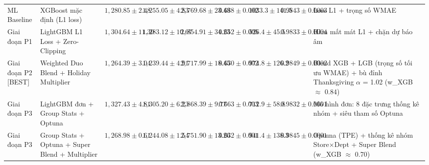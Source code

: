 \begin{table}[htbp]
{\begin{tabular}{llrrrrrrl}
ML Baseline & XGBoost mặc định (L1 loss) & $1{,}280.85 \pm 2.48$ & $1{,}255.05 \pm 4.83$ & $2{,}769.68 \pm 23.48$ & $0.638 \pm 0.002$ & $1033.3 \pm 141.5$ & $0.9843 \pm 0.0003$ & Loss L1 + trọng số WMAE \\
Giai đoạn P1 & LightGBM L1 Loss + Zero-Clipping & $1{,}304.64 \pm 11.30$ & $1{,}283.12 \pm 10.67$ & $2{,}854.91 \pm 34.23$ & $0.652 \pm 0.005$ & $526.4 \pm 45.5$ & $0.9833 \pm 0.0004$ & Hàm mất mát L1 + chặn dự báo âm \\
Giai đoạn P2 [BEST] & Weighted Duo Blend + Holiday Multiplier & \textbf{$1{,}264.39 \pm 3.04$} & \textbf{$1{,}239.44 \pm 4.91$} & \textbf{$2{,}717.99 \pm 18.45$} & \textbf{$0.630 \pm 0.002$} & $974.8 \pm 126.2$ & $0.9849 \pm 0.0002$ & Blend XGB + LGB (trọng số tối ưu WMAE) + bù đỉnh Thanksgiving $\alpha$ = 1.02 (w\_XGB $\approx$ 0.84) \\
Giai đoạn P3 & LightGBM đơn + Group Stats + Optuna & $1{,}327.43 \pm 4.81$ & $1{,}305.20 \pm 6.23$ & $2{,}868.39 \pm 9.77$ & $0.663 \pm 0.003$ & $712.9 \pm 58.8$ & $0.9832 \pm 0.0001$ & Mô hình đơn: 8 đặc trưng thống kê nhóm + siêu tham số Optuna \\
Giai đoạn P3 & Group Stats + Optuna + Super Blend + Multiplier & $1{,}268.98 \pm 0.61$ & $1{,}244.08 \pm 1.54$ & $2{,}751.90 \pm 13.26$ & $0.632 \pm 0.001$ & $941.4 \pm 138.3$ & $0.9845 \pm 0.0001$ & Optuna (TPE) + thống kê nhóm Store$\times$Dept + Super Blend (w\_XGB $\approx$ 0.70) \\
\bottomrule
\end{tabular}}
\end{table}


